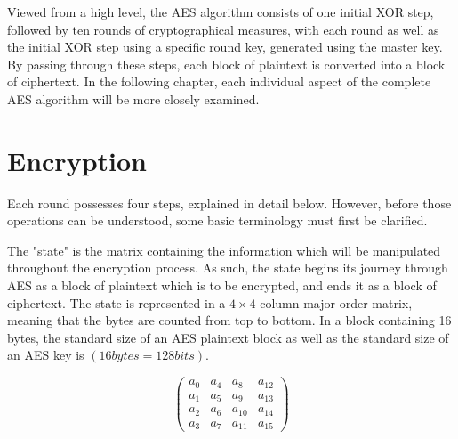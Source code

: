 \documentclass[12pt, a4paper]{report}
\theoremstyle{definition}
\theoremstyle{remark}
\begin{document}
Viewed from a high level, the AES algorithm consists of one initial XOR step, followed by ten rounds of cryptographical measures, with each round as well as the initial XOR step using a specific round key, generated using the master key. By passing through these steps, each block of plaintext is converted into a block of ciphertext. In the following chapter, each individual aspect of the complete AES algorithm will be more closely examined.

\begin{center}
\end{center}

\section{Encryption}
Each round possesses four steps, explained in detail below. However, before those operations can be understood, some basic terminology must first be clarified.

The "state" is the matrix containing the information which will be manipulated throughout the encryption process. As such, the state begins its journey through AES as a block of plaintext which is to be encrypted, and ends it as a block of ciphertext. The state is represented in a $4 \times 4$ column-major order matrix, meaning that the bytes are counted from top to bottom. In a block containing 16 bytes, the standard size of an AES plaintext block as well as the standard size of  an AES key is $(16 bytes = 128 bits)$.

\[ \left( \begin{array}{cccc}
a_0 & a_4 & a_8 & a_{12} \\
a_1 & a_5 & a_9 & a_{13} \\
a_2 & a_6 & a_{10} & a_{14} \\
a_3 & a_7 & a_{11} & a_{15}\end{array} \right)\] 
\end{document}
